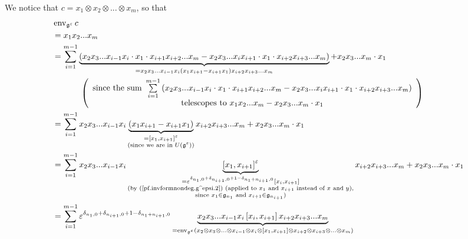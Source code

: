 \documentclass
[numbers=enddot,12pt,final,onecolumn,german,notitlepage]{scrartcl}%
\theoremstyle{definition}
\begin{document}
We notice that $c=x_{1}\otimes x_{2}\otimes...\otimes x_{m}$, so that%
\begin{align}
&  \operatorname*{env}\nolimits_{\mathfrak{g}^{\varepsilon}}c\nonumber\\
&  =x_{1}x_{2}...x_{m}\nonumber\\
&  =\sum\limits_{i=1}^{m-1}\underbrace{\left(  x_{2}x_{3}...x_{i-1}x_{i}\cdot
x_{1}\cdot x_{i+1}x_{i+2}...x_{m}-x_{2}x_{3}...x_{i}x_{i+1}\cdot x_{1}\cdot
x_{i+2}x_{i+3}...x_{m}\right)  }_{=x_{2}x_{3}...x_{i-1}x_{i}\left(
x_{1}x_{i+1}-x_{i+1}x_{1}\right)  x_{i+2}x_{i+3}...x_{m}}+x_{2}x_{3}%
...x_{m}\cdot x_{1}\nonumber\\
&  \ \ \ \ \ \ \ \ \ \ \left(
\begin{array}
[c]{c}%
\text{since the sum }\sum\limits_{i=1}^{m-1}\left(  x_{2}x_{3}...x_{i-1}%
x_{i}\cdot x_{1}\cdot x_{i+1}x_{i+2}...x_{m}-x_{2}x_{3}...x_{i}x_{i+1}\cdot
x_{1}\cdot x_{i+2}x_{i+3}...x_{m}\right) \\
\text{telescopes to }x_{1}x_{2}...x_{m}-x_{2}x_{3}...x_{m}\cdot x_{1}%
\end{array}
\right) \nonumber\\
&  =\sum\limits_{i=1}^{m-1}x_{2}x_{3}...x_{i-1}x_{i}\underbrace{\left(
x_{1}x_{i+1}-x_{i+1}x_{1}\right)  }_{\substack{=\left[  x_{1},x_{i+1}\right]
^{\varepsilon}\\\text{(since we are in }U\left(  \mathfrak{g}^{\varepsilon
}\right)  \text{)}}}x_{i+2}x_{i+3}...x_{m}+x_{2}x_{3}...x_{m}\cdot
x_{1}\nonumber\\
&  =\sum\limits_{i=1}^{m-1}x_{2}x_{3}...x_{i-1}x_{i}\underbrace{\left[
x_{1},x_{i+1}\right]  ^{\varepsilon}}_{\substack{=\varepsilon^{\delta
_{n_{1},0}+\delta_{n_{i+1},0}+1-\delta_{n_{1}+n_{i+1},0}}\left[  x_{i}%
,x_{i+1}\right]  \\\text{(by (\ref{pf.invformnondeg.g^epsi.2}) (applied to
}x_{1}\text{ and }x_{i+1}\text{ instead of }x\text{ and }y\text{),}%
\\\text{since }x_{1}\in\mathfrak{g}_{n_{1}}\text{ and }x_{i+1}\in
\mathfrak{g}_{n_{i+1}}\text{)}}}x_{i+2}x_{i+3}...x_{m}+x_{2}x_{3}...x_{m}\cdot
x_{1}\nonumber\\
&  =\sum\limits_{i=1}^{m-1}\varepsilon^{\delta_{n_{1},0}+\delta_{n_{i+1}%
,0}+1-\delta_{n_{1}+n_{i+1},0}}\underbrace{x_{2}x_{3}...x_{i-1}x_{i}\left[
x_{i},x_{i+1}\right]  x_{i+2}x_{i+3}...x_{m}}_{=\operatorname*{env}%
\nolimits_{\mathfrak{g}^{\varepsilon}}\left(  x_{2}\otimes x_{3}%
\otimes...\otimes x_{i-1}\otimes x_{i}\otimes\left[  x_{1},x_{i+1}\right]
\otimes x_{i+2}\otimes x_{i+3}\otimes...\otimes x_{m}\right)  }%

\end{align}
\end{document}
